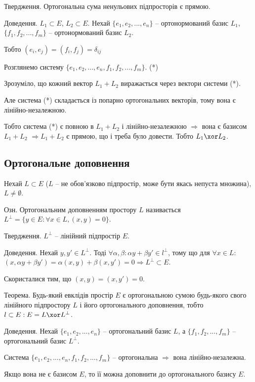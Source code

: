 Твердження.
Ортогональна сума ненульових підпросторів є прямою.

Доведення.
$L_1 \subset E$, $L_2 \subset E$.
Нехай $\{e_1, e_2, ..., e_n\}$ -- ортонормований базис $L_1$,
$\{f_1, f_2, ..., f_m\}$ -- ортонормований базис $L_2$.

Тобто $(e_i,e_j) = (f_i,f_j) = \delta_{ij}$

Розглянемо систему $\{e_1, e_2, ..., e_n, f_1, f_2, ..., f_m\}$. (*)

Зрозуміло, що кожний вектор $L_1 + L_2$ виражається через вектори системи (*).

Але система (*) складається із попарно ортогональних векторів, тому вона є
лінійно-незалежною.

Тобто система (*) є повною в $L_1 + L_2$ і лінійно-незалежною $\Rightarrow$ вона є базисом
$L_1 + L_2$ $\Rightarrow L_1 + L_2$ є прямою, що і треба було довести. Тобто $L_1 \xor L_2$.

\subsection*{Ортогональне доповнення}

Нехай $L \subset E$ ($L$ -- не обов’язково підпростір, може бути якась непуста
множина), $L \neq \emptyset$.

Озн. Ортогональним доповненням простору $L$ називається
$L^{\perp} = \{y \in E: \forall x \in L, (x, y) = 0\}$.

Твердження. $L^{\perp}$ -- лінійний підпростір $E$.

Доведення.
Нехай $y, y' \in L^{\perp}$. Тоді $\forall \alpha, \beta: \alpha y + \beta y' \in l^{\perp}$,
тому що для $\forall x \in L$:
$(x, \alpha y + \beta y') = \alpha(x,y) + \beta(x,y') = 0 \Rightarrow L^{\perp} \subset E$.

Скористалися тим, що $(x, y) = (x, y') = 0$.

Теорема. Будь-який евклідів простір $E$ є ортогональною сумою будь-якого
свого лінійного підпростору $L$ і його ортогонального доповнення, тобто
$l \subset E: E = L \xor L^{\perp}$.

Доведення.
Нехай $\{e_1, e_2, ..., e_n\}$ -- ортогональний базис $L$, а
$\{f_1, f_2, ..., f_m\}$ -- ортогональний базис $L^{\perp}$.

Система $\{e_1, e_2, ..., e_n, f_1, f_2, ..., f_m\}$ -- ортогональна $\Rightarrow$
вона лінійно-незалежна.

Якщо вона не є базисом $E$, то її можна доповнити до ортогонального базису $E$.

